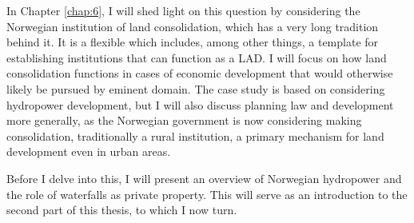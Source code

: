 {In Chapter \ref{chap:6}, I will shed light on this question by considering the Norwegian institution of land consolidation, which has a very long tradition behind it. It is a flexible  which includes, among other things, a template for establishing institutions that can function as a LAD. I will focus on how land consolidation functions in cases of economic development that would otherwise likely be pursued by eminent domain. The case study is based on considering hydropower development, but I will also discuss planning law and development more generally, as the Norwegian government is now considering making consolidation, traditionally a rural institution, a primary mechanism for land development even in urban areas.

Before I delve into this, I will present an overview of Norwegian hydropower and the role of waterfalls  as private property. This will serve as an introduction to the second part of this thesis, to which I now turn. }